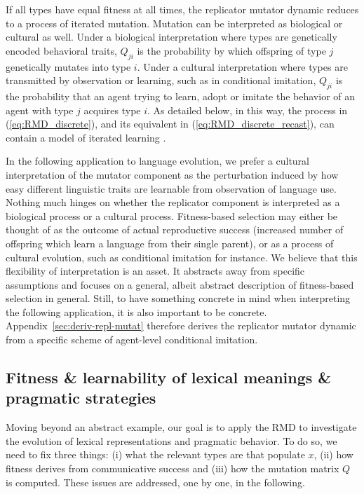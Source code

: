 \documentclass[a4paper, 11pt]{article}
\theoremstyle{Satz}
\begin{document}
If all types have equal fitness at all times, the replicator mutator dynamic reduces to a
process of iterated mutation. Mutation can be interpreted as biological or cultural as
well. Under a biological interpretation where types are genetically encoded behavioral traits,
$Q_{ji}$ is the probability by which offspring of type $j$ genetically mutates into type
$i$. Under a cultural interpretation where types are transmitted by observation or learning,
such as in conditional imitation, $Q_{ji}$ is the probability that an agent trying to learn,
adopt or imitate the behavior of an agent with type $j$ acquires type $i$. As detailed below,
in this way, the process in (\ref{eq:RMD_discrete}), and its equivalent in
(\ref{eq:RMD_discrete_recast}), can contain a model of iterated learning
\citep{griffiths+kalish:2005,griffiths+kalish:2007}.

In the following application to language evolution, we prefer a cultural interpretation of the
mutator component as the perturbation induced by how easy different linguistic traits are
learnable from observation of language use. Nothing much hinges on whether the replicator
component is interpreted as a biological process or a cultural process. Fitness-based selection
may either be thought of as the outcome of actual reproductive success (increased number of
offspring which learn a language from their single parent), or as a process of cultural
evolution, such as conditional imitation for instance. We believe that this flexibility of
interpretation is an asset. It abstracts away from specific assumptions and focuses on a
general, albeit abstract description of fitness-based selection in general. Still, to have
something concrete in mind when interpreting the following application, it is also important to
be concrete. Appendix~\ref{sec:deriv-repl-mutat} therefore derives the replicator mutator
dynamic from a specific scheme of agent-level conditional imitation.


\subsection{Fitness \& learnability of lexical meanings \& pragmatic strategies}
\label{sec:fitn--learn}


Moving beyond an abstract example, our goal is to apply the RMD to investigate the evolution
of lexical representations and pragmatic behavior. To do so, we need to fix three things: (i) what the
relevant types are that populate $x$, (ii) how fitness derives from communicative success and (iii) how the
mutation matrix $Q$ is computed. These issues are addressed, one by one, in the following.
\end{document}
